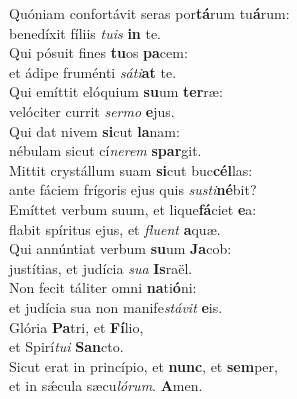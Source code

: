 \evenverse Quóniam confortávit seras por\textbf{tá}rum tu\textbf{á}rum:~\*\\
\evenverse benedíxit fíliis \textit{tu}\textit{is} \textbf{in} te.\\
\oddverse Qui pósuit fines \textbf{tu}os \textbf{pa}cem:~\*\\
\oddverse et ádipe fruménti \textit{sá}\textit{ti}\textbf{at} te.\\
\evenverse Qui emíttit elóquium \textbf{su}um \textbf{ter}ræ:~\*\\
\evenverse velóciter currit \textit{ser}\textit{mo} \textbf{e}jus.\\
\oddverse Qui dat nivem \textbf{si}cut \textbf{la}nam:~\*\\
\oddverse nébulam sicut cí\textit{ne}\textit{rem} \textbf{spar}git.\\
\evenverse Mittit crystállum suam \textbf{si}cut buc\textbf{cél}las:~\*\\
\evenverse ante fáciem frígoris ejus quis \textit{su}\textit{sti}\textbf{né}bit?\\
\oddverse Emíttet verbum suum, et lique\textbf{fá}ciet \textbf{e}a:~\*\\
\oddverse flabit spíritus ejus, et \textit{flu}\textit{ent} \textbf{a}quæ.\\
\evenverse Qui annúntiat verbum \textbf{su}um \textbf{Ja}cob:~\*\\
\evenverse justítias, et judícia \textit{su}\textit{a} \textbf{Is}raël.\\
\oddverse Non fecit táliter omni \textbf{na}ti\textbf{ó}ni:~\*\\
\oddverse et judícia sua non manife\textit{stá}\textit{vit} \textbf{e}is.\\
\evenverse Glória \textbf{Pa}tri, et \textbf{Fí}lio,~\*\\
\evenverse et Spirí\textit{tu}\textit{i} \textbf{San}cto.\\
\oddverse Sicut erat in princípio, et \textbf{nunc}, et \textbf{sem}per,~\*\\
\oddverse et in sǽcula sæcu\textit{ló}\textit{rum}. \textbf{A}men.\\
